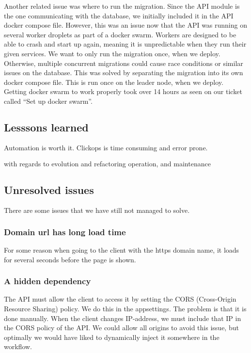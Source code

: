 Another related issue was where to run the migration.
Since the API module is the one communicating with the database,
we initially included it in the API docker compose file.
However, this was an issue now that the API was running on several 
worker droplets as part of a docker swarm. Workers are designed
to be able to crash and start up again, 
meaning it is unpredictable when they run their given services.
We want to only run the migration once, when we deploy.
Otherwise, multiple concurrent migrations could cause 
race conditions or similar issues on the database.
This was solved by separating the migration into its own docker compose file.
This is run once on the leader node, when we deploy.
Getting docker swarm to work properly took over 14 hours 
as seen on our ticket called ``Set up docker swarm''.

\subsection{Lesssons learned}

Automation is worth it.
Clickops is time consuming and error prone.

with regards to
evolution and refactoring
operation, and
maintenance

\subsection{Unresolved issues}

There are some issues that we have still not managed to solve.

\subsubsection{Domain url has long load time}

For some reason when going to the client with the https domain name, 
it loads for several seconds before the page is shown.

\subsubsection{A hidden dependency}

The API must allow the client to access it by 
setting the CORS (Cross-Origin Resource Sharing) policy.
We do this in the appsettings. The problem is that it is done manually.
When the client changes IP-address, we must include 
that IP in the CORS policy of the API.
We could allow all origins to avoid this issue, 
but optimally we would have liked to dynamically 
inject it somewhere in the workflow.

